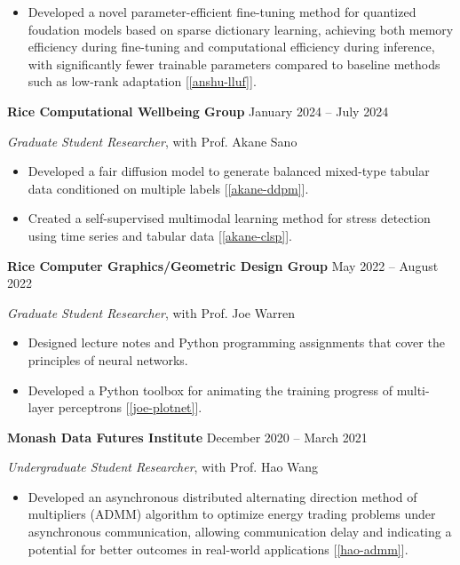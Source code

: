 \documentclass[11pt]{article}
\begin{document}
\begin{itemize}
    \item Developed a novel parameter-efficient fine-tuning method for quantized foudation models based on sparse dictionary learning, achieving both memory efficiency during fine-tuning and computational efficiency during inference, with significantly fewer trainable parameters compared to baseline methods such as low-rank adaptation [\ref{anshu-lluf}].
\end{itemize}

\vspace{\lineskip}

\textbf{Rice Computational Wellbeing Group} \hfill January 2024 -- July 2024

\textit{Graduate Student Researcher}, with Prof. Akane Sano

\begin{itemize}
    \item Developed a fair diffusion model to generate balanced mixed-type tabular data conditioned on multiple labels [\ref{akane-ddpm}].
    \item Created a self-supervised multimodal learning method for stress detection using time series and tabular data [\ref{akane-clsp}].
\end{itemize}

\vspace{\lineskip}

\textbf{Rice Computer Graphics/Geometric Design Group} \hfill May 2022 -- August 2022

\textit{Graduate Student Researcher}, with Prof. Joe Warren

\begin{itemize}
    \item Designed lecture notes and Python programming assignments that cover the principles of neural networks.
    \item Developed a Python toolbox for animating the training progress of multi-layer perceptrons [\ref{joe-plotnet}].
\end{itemize}

\vspace{\lineskip}

\textbf{Monash Data Futures Institute} \hfill December 2020 -- March 2021

\textit{Undergraduate Student Researcher}, with Prof. Hao Wang

\begin{itemize}
    \item Developed an asynchronous distributed alternating direction method of multipliers (ADMM) algorithm to optimize energy trading problems under asynchronous communication, allowing communication delay and indicating a potential for better outcomes in real-world applications [\ref{hao-admm}].
\end{itemize}
\end{document}
